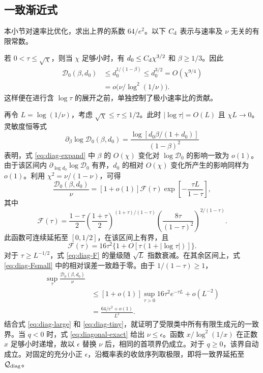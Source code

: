 \documentclass[aps,pra,reprint,amsmath,amssymb,nofootinbib,floatfix,longbibliography]{revtex4-2}
\theoremstyle{aps}
\newcommand{\eps}{\epsilon}
\begin{document}
\subsection{一致渐近式}

本小节对速率比优化，求出上界的系数 $64/e^2$。以下 $C_{\rm d}$ 表示与速率及 $\nu$ 无关的有限常数。

若 $0<\tau\le\sqrt\chi$，则当 $\chi$ 足够小时，有 $d_0\le C_{\rm d}\chi^{3/2}$ 和 $\beta\ge1/3$。因此
\begin{equation}\label{eq:diag-tiny}
 \begin{aligned}
 \mathcal D_0(\beta,d_0)&\le d_0^{1/(1-\beta)}
 \le d_0^{3/2}=O(\chi^{9/4})
 \\&=o\bigl(\nu/\log^2(1/\nu)\bigr).
 \end{aligned}
\end{equation}
这样便在进行含 $\log\tau$ 的展开之前，单独控制了极小速率比的贡献。

再令 $L=\log(1/\nu)$，考虑 $\sqrt\chi\le\tau\le1/2$。此时 $|\log\tau|=O(L)$ 且 $\chi L\to0$。灵敏度恒等式
\begin{equation}\label{eq:diag-derivative}
 \partial_\beta\log\mathcal D_0(\beta,d_0)
 =\frac{\log[d_0\beta/(1+d_0)]}{(1-\beta)^2}
\end{equation}
表明，式 \eqref{eq:diag-expand} 中 $\beta$ 的 $O(\chi)$ 变化对 $\log\mathcal D_0$ 的影响一致为 $o(1)$。由于该区间内 $\partial_{\log d_0}\log\mathcal D_0$ 有界，$d_0$ 的相对 $O(\chi)$ 变化所产生的影响同样为 $o(1)$。利用 $\chi^2=\nu/(1-\nu)$，可得
\begin{equation}\label{eq:diag-F}
 \frac{\mathcal D_0(\beta,d_0)}\nu
 =[1+o(1)]\mathcal F(\tau)
 \exp\left[-\frac{\tau L}{1-\tau}\right],
\end{equation}
其中
\begin{equation}\label{eq:diag-Fdef}
 \mathcal F(\tau)=\frac{1-\tau}{2}
 \left(\frac{1+\tau}{2}\right)^{(1+\tau)/(1-\tau)}
 \left(\frac{8\tau}{(1-\tau)^2}\right)^{2/(1-\tau)}.
\end{equation}
此函数可连续延拓至 $[0,1/2]$，在该区间上有界，且
\begin{equation}\label{eq:diag-Fsmall}
 \mathcal F(\tau)=16\tau^2
 \{1+O[\tau(1+|\log\tau|)]\}.
\end{equation}
对于 $\tau\ge L^{-1/2}$，式 \eqref{eq:diag-F} 的量级随 $\sqrt L$ 指数衰减。在其余区间上，式 \eqref{eq:diag-Fsmall} 中的相对误差一致趋于零。由于 $1/(1-\tau)\ge1$，
\begin{equation}\label{eq:diag-optimized}
 \begin{aligned}
 \sup_\tau\frac{\mathcal D_0(\beta,d_0)}\nu
 \\&\le[1+o(1)]\sup_{\tau>0}16\tau^2e^{-\tau L}+o(L^{-2})
 \\&=\frac{64/e^2+o(1)}{L^2}.
 \end{aligned}
\end{equation}
结合式 \eqref{eq:diag-large} 和 \eqref{eq:diag-tiny}，就证明了受限类中所有有限生成元的一致界。当 $q<0$ 时，式 \eqref{eq:diagonal-exact} 给出 $\nu\le\eps$。函数 $x/\log^2(1/x)$ 在正数 $x$ 足够小时递增，故以 $\eps$ 替换 $\nu$ 后，相同的首项界仍成立。对于 $q\ge0$，该界自动成立。对固定的充分小正 $\eps$，沿概率表的收敛序列取极限，即将一致界延拓至 $\mathcal Q_{\rm diag}$。
\end{document}
